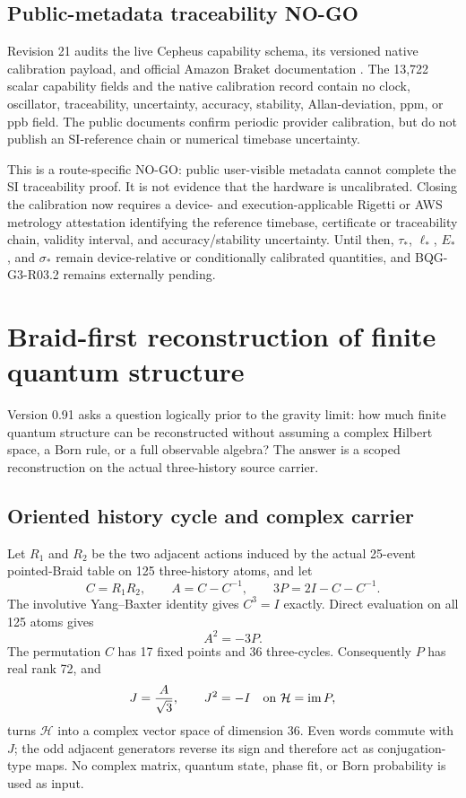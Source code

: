 \documentclass[11pt]{article}
\theoremstyle{definition}
\theoremstyle{remark}
\begin{document}
\subsection{Public-metadata traceability NO-GO}

Revision 21 audits the live Cepheus capability schema, its versioned native calibration payload, and official Amazon Braket documentation \cite{awsPulse,awsNativePulse}. The 13,722 scalar capability fields and the native calibration record contain no clock, oscillator, traceability, uncertainty, accuracy, stability, Allan-deviation, ppm, or ppb field. The public documents confirm periodic provider calibration, but do not publish an SI-reference chain or numerical timebase uncertainty.

This is a route-specific NO-GO: public user-visible metadata cannot complete the SI traceability proof. It is not evidence that the hardware is uncalibrated. Closing the calibration now requires a device- and execution-applicable Rigetti or AWS metrology attestation identifying the reference timebase, certificate or traceability chain, validity interval, and accuracy/stability uncertainty. Until then, $\tau_*$, $\ell_*$, $E_*$, and $\sigma_*$ remain device-relative or conditionally calibrated quantities, and BQG-G3-R03.2 remains externally pending.

\section{Braid-first reconstruction of finite quantum structure}\label{sec:quantumreconstruction091}

Version 0.91 asks a question logically prior to the gravity limit: how much finite quantum structure can be reconstructed without assuming a complex Hilbert space, a Born rule, or a full observable algebra? The answer is a scoped reconstruction on the actual three-history source carrier.

\subsection{Oriented history cycle and complex carrier}

Let $R_1$ and $R_2$ be the two adjacent actions induced by the actual 25-event pointed-Braid table on 125 three-history atoms, and let
\begin{equation}
 C=R_1R_2,\qquad
 A=C-C^{-1},\qquad
 3P=2I-C-C^{-1}.
\end{equation}
The involutive Yang--Baxter identity gives $C^3=I$ exactly. Direct evaluation on all 125 atoms gives
\begin{equation}
 A^2=-3P.
\end{equation}
The permutation $C$ has 17 fixed points and 36 three-cycles. Consequently $P$ has real rank 72, and
\begin{equation}
 J=\frac{A}{\sqrt3},\qquad J^2=-I\quad\hbox{on }\mathcal H=\operatorname{im}P,
\end{equation}
turns $\mathcal H$ into a complex vector space of dimension 36. Even words commute with $J$; the odd adjacent generators reverse its sign and therefore act as conjugation-type maps. No complex matrix, quantum state, phase fit, or Born probability is used as input.
\end{document}
